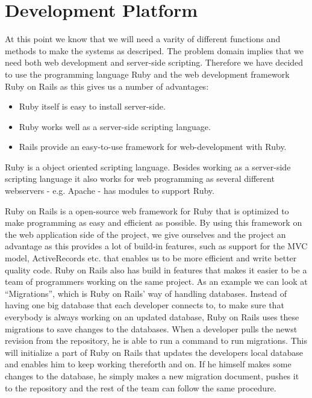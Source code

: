 \section{Development Platform}
At this point we know that we will need a varity of different functions and methods to make the systems as descriped.
The problem domain implies that we need both web development and server-side scripting. 
Therefore we have decided to use the programming language Ruby and the web development framework Ruby on Rails as this gives us a number of advantages:

\begin{itemize}
	\item Ruby itself is easy to install server-side.
	\item Ruby works well as a server-side scripting language.
	\item Rails provide an easy-to-use framework for web-development with Ruby.
\end{itemize}

Ruby is a object oriented scripting language.
Besides working as a server-side scripting language it also works for web programming as several different webservers - e.g. Apache - has modules to support Ruby. 

Ruby on Rails is a open-source web framework for Ruby that is optimized to make programming as easy and efficient as possible. 
By using this framework on the web application side of the project, we give ourselves and the project an advantage as this provides a lot of build-in features, such as support for the MVC model, ActiveRecords etc. that enables us to be more efficient and write better quality code.
Ruby on Rails also has build in features that makes it easier to be a team of programmers working on the same project.
As an example we can look at ``Migrations'', which is Ruby on Rails' way of handling databases.
Instead of having one big database that each developer connects to, to make sure that everybody is always working on an updated database, Ruby on Rails uses these migrations to save changes to the databases.
When a developer pulls the newst revision from the repository, he is able to run a command to run migrations.
This will initialize a part of Ruby on Rails that updates the developers local database and enables him to keep working thereforth and on. 
If he himself makes some changes to the database, he simply makes a new migration document, pushes it to the repository and the rest of the team can follow the same procedure. 

